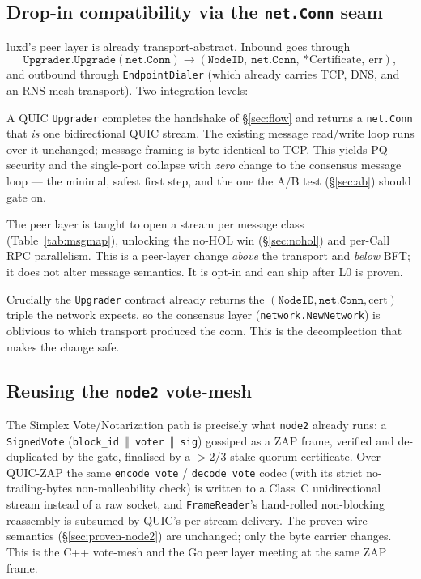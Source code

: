 \documentclass[11pt,a4paper]{article}
\newcommand{\msg}[1]{\textsf{#1}}
\newcommand{\code}[1]{\texttt{#1}}
\begin{document}
\subsection{Drop-in compatibility via the \texttt{net.Conn} seam}\label{sec:seam}

luxd's peer layer is already transport-abstract. Inbound goes through
\[
  \code{Upgrader.Upgrade}(\code{net.Conn}) \to (\code{NodeID},\ \code{net.Conn},\ \text{*Certificate},\ \text{err}),
\]
and outbound through \code{EndpointDialer} (which already carries TCP,
DNS, and an RNS mesh transport). Two integration levels:

\begin{description}[nosep,leftmargin=1.2cm]
  \item[L0 --- Conservative drop-in.] A QUIC \code{Upgrader} completes
        the handshake of \S\ref{sec:flow} and returns a \code{net.Conn}
        that \emph{is} one bidirectional QUIC stream. The existing
        message read/write loop runs over it unchanged; message framing
        is byte-identical to TCP. This yields PQ security and the
        single-port collapse with \emph{zero} change to the consensus
        message loop --- the minimal, safest first step, and the one the
        A/B test (\S\ref{sec:ab}) should gate on.
  \item[L1 --- Full multiplex.] The peer layer is taught to open a
        stream per message class (Table~\ref{tab:msgmap}), unlocking the
        no-HOL win (\S\ref{sec:nohol}) and per-Call RPC parallelism. This
        is a peer-layer change \emph{above} the transport and \emph{below}
        BFT; it does not alter message semantics. It is opt-in and can
        ship after L0 is proven.
\end{description}

Crucially the \code{Upgrader} contract already returns the
$(\code{NodeID}, \code{net.Conn}, \text{cert})$ triple the network
expects, so the consensus layer (\code{network.NewNetwork}) is oblivious
to which transport produced the conn. This is the decomplection that
makes the change safe.

\subsection{Reusing the \texttt{node2} vote-mesh}\label{sec:votemesh}

The Simplex \msg{Vote}/\msg{Notarization} path is precisely what
\code{node2} already runs: a \code{SignedVote}
(\code{block\_id\,$\Vert$\,voter\,$\Vert$\,sig}) gossiped as a ZAP frame,
verified and de-duplicated by the gate, finalised by a $>2/3$-stake
quorum certificate. Over QUIC-ZAP the same \code{encode\_vote} /
\code{decode\_vote} codec (with its strict no-trailing-bytes
non-malleability check) is written to a Class~C unidirectional stream
instead of a raw socket, and \code{FrameReader}'s hand-rolled non-blocking
reassembly is subsumed by QUIC's per-stream delivery. The proven wire
semantics (\S\ref{sec:proven-node2}) are unchanged; only the byte
carrier changes. This is the C++ vote-mesh and the Go peer layer meeting
at the same ZAP frame.
\end{document}
